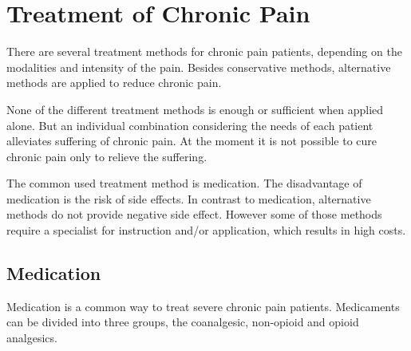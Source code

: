 

\section{Treatment of Chronic Pain} \label{sec:treatment}
There are several treatment methods for chronic pain patients, depending on the modalities and intensity of the pain. Besides conservative methods, alternative methods are applied to reduce chronic pain. %
\cite{marcus2009,pope2017}

None of the different treatment methods is enough or sufficient when applied alone. But an individual combination considering the needs of each patient alleviates suffering of chronic pain. At the moment it is not possible to cure chronic pain only to relieve the suffering. \cite{marcus2009,pope2017} 

The common used treatment method is medication. The disadvantage of medication is the risk of side effects. In contrast to medication, alternative methods do not provide negative side effect. However some of those methods require a specialist for instruction and/or application, which results in high costs. \cite{marcus2009,pope2017}

\subsection{Medication}
Medication is a common way to treat severe chronic pain patients. %
Medicaments can be divided into three groups, the coanalgesic, non-opioid and opioid analgesics. \cite{marcus2009}

